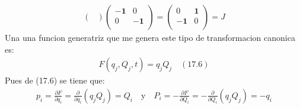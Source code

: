 \documentclass[a4paper]{article}
\begin{document}
\begin{answer}[Punto 3]
\begin{align*}
\begin{pmatrix}
            \end{pmatrix} \begin{pmatrix}
                -\mathbf 1 & 0\\
                0 & -\mathbf 1\\
            \end{pmatrix} = \begin{pmatrix}
                0 & \mathbf 1\\
                -\mathbf 1 & 0\\
            \end{pmatrix} = J
        \end{align*}
        Una una funcion generatriz que me genera este tipo de transformacion canonica  es:
        \begin{align*}
            F(q_j, Q_j,t) = q_jQ_j \quad (17.6)
        \end{align*}
        Pues de (17.6) se tiene que:
        \begin{align*}
            p_i = \frac{\partial F}{\partial q_i} = \frac{\partial}{\partial q_i} (q_jQ_j) = Q_i \quad \text{y} \quad P_i = -\frac{\partial F}{\partial Q_i} = -\frac{\partial}{\partial Q_i} (q_jQ_j) = -q_i
        \end{align*}        
    \end{answer}
    
\end{document}
